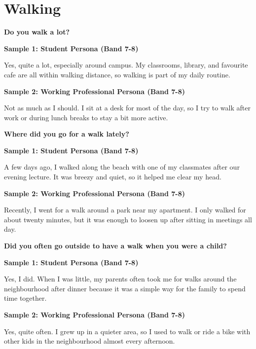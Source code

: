 \newpage

\section{Walking}
\begin{ieltsquestion}
\textbf{Do you walk a lot?}
\end{ieltsquestion}
\textbf{Sample 1: Student Persona (Band 7-8)}

Yes, quite a lot, especially around campus. My classrooms, library, and favourite cafe are all within walking distance, so walking is part of my daily routine.

\textbf{Sample 2: Working Professional Persona (Band 7-8)}

Not as much as I should. I sit at a desk for most of the day, so I try to walk after work or during lunch breaks to stay a bit more active.

\separator

\begin{ieltsquestion}
\textbf{Where did you go for a walk lately?}
\end{ieltsquestion}
\textbf{Sample 1: Student Persona (Band 7-8)}

A few days ago, I walked along the beach with one of my classmates after our evening lecture. It was breezy and quiet, so it helped me clear my head.

\textbf{Sample 2: Working Professional Persona (Band 7-8)}

Recently, I went for a walk around a park near my apartment. I only walked for about twenty minutes, but it was enough to loosen up after sitting in meetings all day.

\separator

\begin{ieltsquestion}
\textbf{Did you often go outside to have a walk when you were a child?}
\end{ieltsquestion}
\textbf{Sample 1: Student Persona (Band 7-8)}

Yes, I did. When I was little, my parents often took me for walks around the neighbourhood after dinner because it was a simple way for the family to spend time together.

\textbf{Sample 2: Working Professional Persona (Band 7-8)}

Yes, quite often. I grew up in a quieter area, so I used to walk or ride a bike with other kids in the neighbourhood almost every afternoon.

\separator

